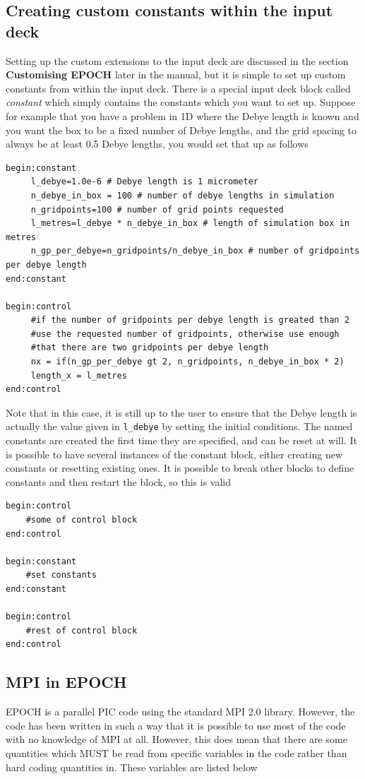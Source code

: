 \documentclass[12pt]{article}
\begin{document}
\subsection{Creating custom constants within the input deck}
Setting up the custom extensions to the input deck are discussed in the section {\bf Customising EPOCH} later in the manual, but it is simple to set up custom constants from within the input deck. There is a special input deck block called {\it constant} which simply contains the constants which you want to set up. Suppose for example that you have a problem in 1D where the Debye length is known and you want the box to be a fixed number of Debye lengths, and the grid spacing to always be at least 0.5 Debye lengths, you would set that up as follows\\
\begin{verbatim}
begin:constant
     l_debye=1.0e-6 # Debye length is 1 micrometer
     n_debye_in_box = 100 # number of debye lengths in simulation
     n_gridpoints=100 # number of grid points requested
     l_metres=l_debye * n_debye_in_box # length of simulation box in metres
     n_gp_per_debye=n_gridpoints/n_debye_in_box # number of gridpoints per debye length
end:constant

begin:control
     #if the number of gridpoints per debye length is greated than 2
     #use the requested number of gridpoints, otherwise use enough
     #that there are two gridpoints per debye length
     nx = if(n_gp_per_debye gt 2, n_gridpoints, n_debye_in_box * 2)
     length_x = l_metres
end:control
\end{verbatim}
Note that in this case, it is still up to the user to ensure that the Debye length is actually the value given in \texttt{l\_debye} by setting the initial conditions. The named constants are created the first time they are specified, and can be reset at will. It is possible to have several instances of the constant block, either creating new constants or resetting existing ones. It is possible to break other blocks to define constants and then restart the block, so this is valid\\
\begin{verbatim}
begin:control
    #some of control block
end:control

begin:constant
    #set constants
end:constant

begin:control
    #rest of control block
end:control
\end{verbatim}
\subsection{MPI in EPOCH}
EPOCH is a parallel PIC code using the standard MPI 2.0 library. However, the code has been written in such a way that it is possible to use most of the code with no knowledge of MPI at all. However, this does mean that there are some quantities which MUST be read from specific variables in the code rather than hard coding quantities in. These variables are listed below
\end{document}
